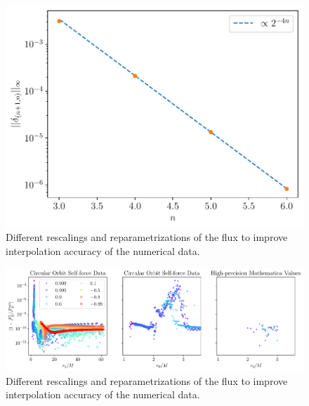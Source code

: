 \documentclass[%
 reprint,
 nofootinbib,
 amsmath,amssymb,
 aps,
 prd,
]{revtex4-2}
\begin{document}
\begin{figure}[bhtp]
    \centering
    \includegraphics[width=0.95\linewidth]{figures/spline_convergence.pdf}
    \caption{Different rescalings and reparametrizations of the flux to improve interpolation accuracy of the numerical data.}
    \label{fig:fluxSplineConvergence}
\end{figure}

\begin{figure}[bhtp]
    \centering
    \includegraphics[width=0.95\linewidth]{figures/flux_comparison.pdf}
    \caption{Different rescalings and reparametrizations of the flux to improve interpolation accuracy of the numerical data.}
    \label{fig:fluxComparison}
\end{figure}
\end{document}
